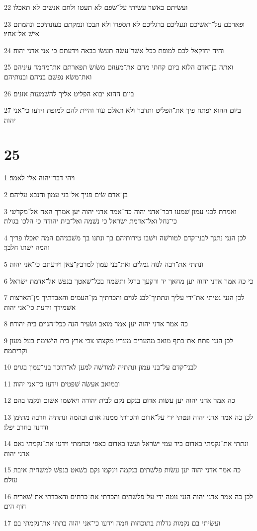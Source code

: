 \par 22 ועשׂיתם כאשׁר עשׂיתי על־שׂפם לא תעטו ולחם אנשׁים לא תאכלו׃
\par 23 ופארכם על־ראשׁיכם ונעליכם ברגליכם לא תספדו ולא תבכו ונמקתם בעונתיכם ונהמתם אישׁ אל־אחיו׃
\par 24 והיה יחזקאל לכם למופת ככל אשׁר־עשׂה תעשׂו בבאה וידעתם כי אני אדני יהוה׃
\par 25 ואתה בן־אדם הלוא ביום קחתי מהם את־מעוזם משׂושׂ תפארתם את־מחמד עיניהם ואת־משׂא נפשׁם בניהם ובנותיהם׃
\par 26 ביום ההוא יבוא הפליט אליך להשׁמעות אזנים׃
\par 27 ביום ההוא יפתח פיך את־הפליט ותדבר ולא תאלם עוד והיית להם למופת וידעו כי־אני יהוה׃

\chapter{25}

\par 1 ויהי דבר־יהוה אלי לאמר׃
\par 2 בן־אדם שׂים פניך אל־בני עמון והנבא עליהם׃
\par 3 ואמרת לבני עמון שׁמעו דבר־אדני יהוה כה־אמר אדני יהוה יען אמרך האח אל־מקדשׁי כי־נחל ואל־אדמת ישׂראל כי נשׁמה ואל־בית יהודה כי הלכו בגולה׃
\par 4 לכן הנני נתנך לבני־קדם למורשׁה וישׁבו טירותיהם בך ונתנו בך משׁכניהם המה יאכלו פריך והמה ישׁתו חלבך׃
\par 5 ונתתי את־רבה לנוה גמלים ואת־בני עמון למרבץ־צאן וידעתם כי־אני יהוה׃
\par 6 כי כה אמר אדני יהוה יען מחאך יד ורקעך ברגל ותשׂמח בכל־שׁאטך בנפשׁ אל־אדמת ישׂראל׃
\par 7 לכן הנני נטיתי את־ידי עליך ונתתיך־לבג לגוים והכרתיך מן־העמים והאבדתיך מן־הארצות אשׁמידך וידעת כי־אני יהוה׃
\par 8 כה אמר אדני יהוה יען אמר מואב ושׂעיר הנה ככל־הגוים בית יהודה׃
\par 9 לכן הנני פתח את־כתף מואב מהערים מעריו מקצהו צבי ארץ בית הישׁימת בעל מעון וקריתמה׃
\par 10 לבני־קדם על־בני עמון ונתתיה למורשׁה למען לא־תזכר בני־עמון בגוים׃
\par 11 ובמואב אעשׂה שׁפטים וידעו כי־אני יהוה׃
\par 12 כה אמר אדני יהוה יען עשׂות אדום בנקם נקם לבית יהודה ויאשׁמו אשׁום ונקמו בהם׃
\par 13 לכן כה אמר אדני יהוה ונטתי ידי על־אדום והכרתי ממנה אדם ובהמה ונתתיה חרבה מתימן ודדנה בחרב יפלו׃
\par 14 ונתתי את־נקמתי באדום ביד עמי ישׂראל ועשׂו באדום כאפי וכחמתי וידעו את־נקמתי נאם אדני יהוה׃
\par 15 כה אמר אדני יהוה יען עשׂות פלשׁתים בנקמה וינקמו נקם בשׁאט בנפשׁ למשׁחית איבת עולם׃
\par 16 לכן כה אמר אדני יהוה הנני נוטה ידי על־פלשׁתים והכרתי את־כרתים והאבדתי את־שׁארית חוף הים׃
\par 17 ועשׂיתי בם נקמות גדלות בתוכחות חמה וידעו כי־אני יהוה בתתי את־נקמתי בם׃

